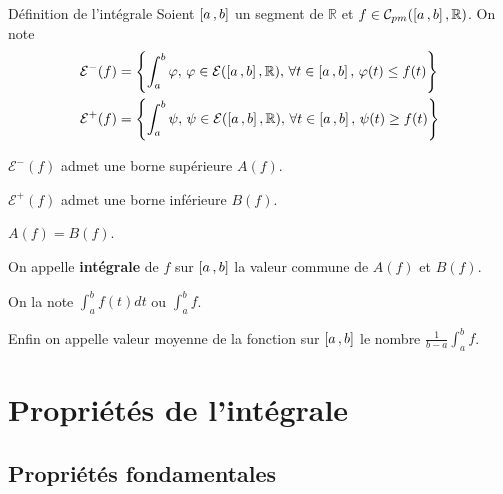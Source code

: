     \begin{theo}{Définition de l’intégrale}{}
        Soient $\left[ a \, , b \right]$ un segment de $\mathbb{R}$ et $f \in \mathcal{C}_{pm}(\left[ a \, , b \right],\mathbb{R})$.
        On note 
        \begin{align*}
            \mathcal{E}^-(f) &= \left\{ \int_{a}^{b} \varphi, \, \varphi \in \mathcal{E}(\left[ a \, , b \right],\mathbb{R}),\, \forall t \in \left[ a \, , b \right], \, \varphi(t) \leq f(t) \right\} \\
         \mathcal{E}^+(f) &= \left\{ \int_{a}^{b} \psi, \, \psi \in \mathcal{E}(\left[ a \, , b \right],\mathbb{R}), \, \forall t \in \left[ a \, , b \right], \, \psi(t) \geq f(t) \right\}
        \end{align*}
        \begin{alors}
            \item $\mathcal{E}^-(f)$ admet une borne supérieure $A(f)$.
            \item $\mathcal{E}^+(f)$ admet une borne inférieure $B(f)$.
            \item $A(f) = B(f)$.
        \end{alors}
        On appelle \textbf{intégrale} de $f$ sur $\left[ a \, , b \right]$ la valeur commune de $A(f)$ et $B(f)$.

        On la note $\int_{a}^b f(t)dt$ ou $\int_a^b f$.

        Enfin on appelle valeur moyenne de la fonction sur $\left[ a \, , b \right]$ le nombre $\frac{1}{b-a} \int_a^b f$.
    \end{theo}

\section{Propriétés de l’intégrale}

    \subsection{Propriétés fondamentales}

